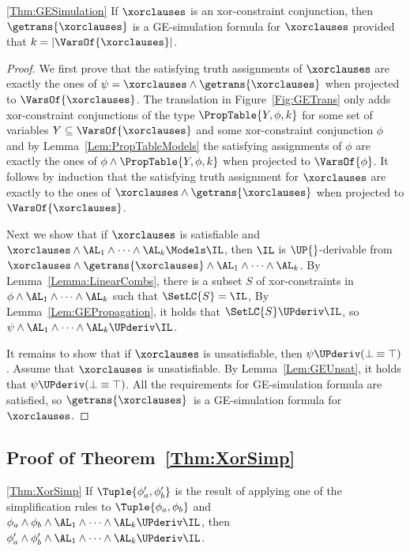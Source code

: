\begin{retheorem}{\ref{Thm:GESimulation}} 
If $\xorclauses$ is an xor-constraint
conjunction, then $\getrans{\xorclauses}$ is a GE-simulation formula for
$\xorclauses$ provided that $k=|\VarsOf{\xorclauses}|$.
\end{retheorem}

\begin{proof}
We first prove that the satisfying truth assignments of $\xorclauses$ are
exactly the ones of $\psi = \xorclauses \wedge \getrans{\xorclauses}$ when
projected to $\VarsOf{\xorclauses}$. 
The translation \getransname{} in Figure~\ref{Fig:GETrans} only adds xor-constraint
conjunctions of the type $\PropTable{Y, \phi, k} $ for some set of variables $
Y \subseteq \VarsOf{\xorclauses}$ and some xor-constraint conjunction $\phi$
and by Lemma~\ref{Lem:PropTableModels} the satisfying assignments
of $ \phi$ are exactly the ones of $ \phi \wedge \PropTable{Y, \phi, k}$ 
when projected to $ \VarsOf{\phi} $.
It follows by induction that the satisfying truth assignment for $\xorclauses$
are exactly to the ones of $ \xorclauses \wedge 
\getrans{\xorclauses}$ when projected to $ \VarsOf{\xorclauses}$.

Next we show that if $\xorclauses$ is satisfiable 
and 
 $\xorclauses \wedge \AL_1 \wedge \dots \wedge \AL_k \Models \IL$, then $\IL$ is $\UP{}$-derivable from $ \xorclauses \wedge \getrans{\xorclauses} \wedge \AL_1 \wedge \dots \wedge \AL_k$. 
By Lemma~\ref{Lemma:LinearCombs}, there is a subset $S$ of xor-constraints in $\phi \wedge \AL_1 \wedge \dots \wedge \AL_k $ such that $ \SetLC{S} = \IL $,
By Lemma~\ref{Lem:GEPropagation}, it holds that 
$\SetLC{S} \UPderiv \IL $, so $ \psi \wedge \AL_1 \wedge \dots \wedge \AL_k \UPderiv \IL $.

It remains to show that if $\xorclauses$ is unsatisfiable,
   then $\psi \UPderiv (\bot \equiv \top)$. Assume that 
   $\xorclauses$ is unsatisfiable. By Lemma~\ref{Lem:GEUnsat}, it holds
   that $\psi \UPderiv (\bot \equiv \top)$.
All the requirements for GE-simulation formula are satisfied, so $\getrans{\xorclauses}$ is a GE-simulation formula for $\xorclauses$.
\end{proof}

\subsection{Proof of Theorem~\ref{Thm:XorSimp}}
\begin{retheorem}{\ref{Thm:XorSimp}}
If $ \Tuple{\phi_a', \phi_b'} $ is the result of applying
one of the simplification rules to $ \Tuple{\phi_a, \phi_b} $ 
and 
$\phi_a \wedge \phi_b \wedge \AL_1 \wedge \dots \wedge
\AL_k \UPderiv \IL $, then $\phi_a' \wedge \phi_b' \wedge
\AL_1 \wedge \dots \wedge \AL_k \UPderiv \IL $.  
\end{retheorem}

